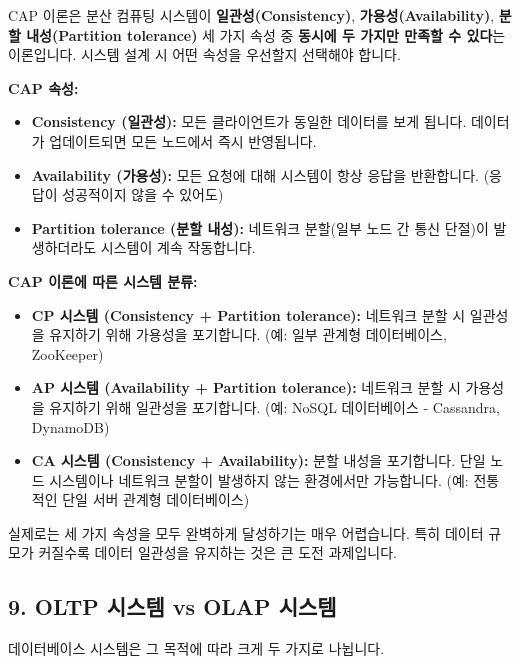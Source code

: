 \documentclass[11pt,a4paper]{article}
\begin{document}
\begin{summarybox}
CAP 이론은 분산 컴퓨팅 시스템이 \textbf{일관성(Consistency)}, \textbf{가용성(Availability)}, \textbf{분할 내성(Partition tolerance)} 세 가지 속성 중 \textbf{동시에 두 가지만 만족할 수 있다}는 이론입니다. 시스템 설계 시 어떤 속성을 우선할지 선택해야 합니다.
\end{summarybox}

\textbf{CAP 속성:}
\begin{itemize}
    \item \textbf{Consistency (일관성):} 모든 클라이언트가 동일한 데이터를 보게 됩니다. 데이터가 업데이트되면 모든 노드에서 즉시 반영됩니다.
    \item \textbf{Availability (가용성):} 모든 요청에 대해 시스템이 항상 응답을 반환합니다. (응답이 성공적이지 않을 수 있어도)
    \item \textbf{Partition tolerance (분할 내성):} 네트워크 분할(일부 노드 간 통신 단절)이 발생하더라도 시스템이 계속 작동합니다.
\end{itemize}

\textbf{CAP 이론에 따른 시스템 분류:}
\begin{itemize}
    \item \textbf{CP 시스템 (Consistency + Partition tolerance):} 네트워크 분할 시 일관성을 유지하기 위해 가용성을 포기합니다. (예: 일부 관계형 데이터베이스, ZooKeeper)
    \item \textbf{AP 시스템 (Availability + Partition tolerance):} 네트워크 분할 시 가용성을 유지하기 위해 일관성을 포기합니다. (예: NoSQL 데이터베이스 - Cassandra, DynamoDB)
    \item \textbf{CA 시스템 (Consistency + Availability):} 분할 내성을 포기합니다. 단일 노드 시스템이나 네트워크 분할이 발생하지 않는 환경에서만 가능합니다. (예: 전통적인 단일 서버 관계형 데이터베이스)
\end{itemize}

\begin{warningbox}
실제로는 세 가지 속성을 모두 완벽하게 달성하기는 매우 어렵습니다. 특히 데이터 규모가 커질수록 데이터 일관성을 유지하는 것은 큰 도전 과제입니다.
\end{warningbox}

\subsection*{9. OLTP 시스템 vs OLAP 시스템}

데이터베이스 시스템은 그 목적에 따라 크게 두 가지로 나뉩니다.
\end{document}
